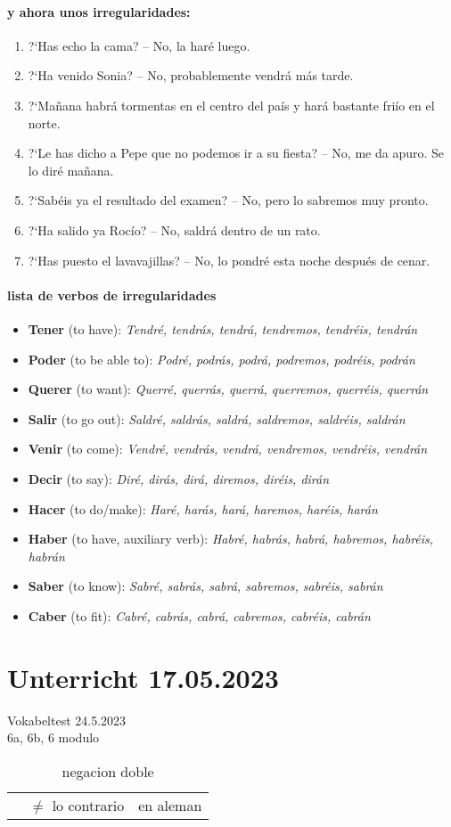 \documentclass{article}
\begin{document}
\vspace{15pt}

\paragraph{y ahora unos irregularidades:}
\begin{enumerate}
  \item ?`Has echo la cama? -- No, la har\'e luego.
  \item ?`Ha venido Sonia? -- No, probablemente vendr\'a m\'as tarde.
  \item ?`Ma\~nana habr\'a tormentas en el centro del pa\'is y har\'a bastante fri\'io en el norte.
  \item ?`Le has dicho a Pepe que no podemos ir a su fiesta? -- No, me da apuro. Se lo dir\'e ma\~nana.
  \item ?`Sab\'eis ya el resultado del examen? -- No, pero lo sabremos muy pronto.
  \item ?`Ha salido ya Roc\'io? -- No, saldr\'a dentro de un rato.
  \item ?`Has puesto el lavavajillas? -- No, lo pondr\'e esta noche despu\'es de cenar. 
\end{enumerate}


\paragraph{lista de verbos de irregularidades}
\begin{itemize}
\item \textbf{Tener} (to have): \textit{Tendré, tendrás, tendrá, tendremos, tendréis, tendrán}
\item \textbf{Poder} (to be able to): \textit{Podré, podrás, podrá, podremos, podréis, podrán}
\item \textbf{Querer} (to want): \textit{Querré, querrás, querrá, querremos, querréis, querrán}
\item \textbf{Salir} (to go out): \textit{Saldré, saldrás, saldrá, saldremos, saldréis, saldrán}
\item \textbf{Venir} (to come): \textit{Vendré, vendrás, vendrá, vendremos, vendréis, vendrán}
\item \textbf{Decir} (to say): \textit{Diré, dirás, dirá, diremos, diréis, dirán}
\item \textbf{Hacer} (to do/make): \textit{Haré, harás, hará, haremos, haréis, harán}
\item \textbf{Haber} (to have, auxiliary verb): \textit{Habré, habrás, habrá, habremos, habréis, habrán}
\item \textbf{Saber} (to know): \textit{Sabré, sabrás, sabrá, sabremos, sabréis, sabrán}
\item \textbf{Caber} (to fit): \textit{Cabré, cabrás, cabrá, cabremos, cabréis, cabrán}
\end{itemize}


\clearpage
\section{Unterricht 17.05.2023}

Vokabeltest 24.5.2023\\
6a, 6b, 6 modulo

\begin{table}[htpb]
    \centering
    \label{tab:doble}
    \begin{tabular}{l l l}
         & $\ne$ lo contrario & en aleman &
    \end{tabular}
    \caption{negacion doble}
\end{table}
\end{document}
